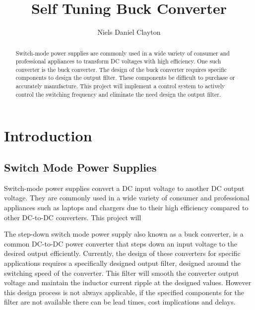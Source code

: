 \documentclass[11pt, a4paper, twoside, openright]{report}
\title{Self Tuning Buck Converter}
\author{Niels Daniel Clayton}
\begin{document}
\frontmatter


\begin{abstract}

Switch-mode power supplies are commonly used in a wide variety of consumer and professional appliances to transform DC voltages with high efficiency. One such converter is the buck converter. The design of the buck converter requires specific components to design the output filter. These components be difficult to purchase or accurately manufacture. This project will implement a control system to actively control the switching frequency and eliminate the need design the output filter.   

\end{abstract}


\maketitle

\tableofcontents



\mainmatter


\section{Introduction}


\subsection{Switch Mode Power Supplies}

Switch-mode power supplies convert a DC input voltage to another DC output voltage. They are commonly used in a wide variety of consumer and professional appliances such as laptops and chargers due to their high efficiency compared to other DC-to-DC converters. This project will 

The step-down switch mode power supply also known as a buck converter, is a common DC-to-DC power converter that steps down an input voltage to the desired output efficiently. Currently, the design of these converters for specific applications requires a specifically designed output filter, designed around the switching speed of the converter. This filter will smooth the converter output voltage and maintain the inductor current ripple at the designed values. However this design process is not always applicable, if the specified components for the filter are not available there can be lead times, cost implications and delays.
\end{document}

